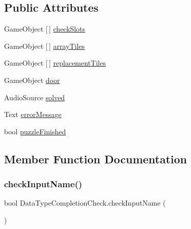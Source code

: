 \subsection*{Public Attributes}
\begin{DoxyCompactItemize}
\item 
Game\+Object \mbox{[}$\,$\mbox{]} \hyperlink{class_data_type_completion_check_ace0376e59ce94a6d019a51a160acdfad}{check\+Slots}
\item 
Game\+Object \mbox{[}$\,$\mbox{]} \hyperlink{class_data_type_completion_check_a0ff49d8fba4310d33f2ba4d73c7a4c5c}{array\+Tiles}
\item 
Game\+Object \mbox{[}$\,$\mbox{]} \hyperlink{class_data_type_completion_check_a449d1553d09ac32e51a559a98060a938}{replacement\+Tiles}
\item 
Game\+Object \hyperlink{class_data_type_completion_check_a30fb1fb9074db5c7585e72a1ea4f85d7}{door}
\item 
Audio\+Source \hyperlink{class_data_type_completion_check_ab5a51018023ce893836ccfabf1c73f60}{solved}
\item 
Text \hyperlink{class_data_type_completion_check_ae9a30b339b4e198795dfe7bc2bf57c11}{error\+Message}
\item 
bool \hyperlink{class_data_type_completion_check_a888ca57a6f64ac6e4eefa302a8067986}{puzzle\+Finished}
\end{DoxyCompactItemize}


\subsection{Member Function Documentation}
\mbox{\label{class_data_type_completion_check_a508b3241c277e5fa65a9d9510f971946}} 
\subsubsection{\texorpdfstring{check\+Input\+Name()}{checkInputName()}}
{\footnotesize\ttfamily bool Data\+Type\+Completion\+Check.\+check\+Input\+Name (\begin{DoxyParamCaption}{ }\end{DoxyParamCaption})}

\mbox{\label{class_data_type_completion_check_ac2ed1c70356ebaf4db5ecb26edccda66}} 
